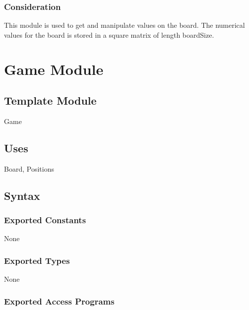 \documentclass[12pt]{article}
\begin{document}
\subsubsection* {Consideration}

This module is used to get and manipulate values on the board. The numerical values for the board is stored in a square matrix of length boardSize. 

\newpage

\section* {Game Module}

\subsection*{Template Module}

Game

\subsection* {Uses}

Board, Positions

\subsection* {Syntax}

\subsubsection* {Exported Constants}

None

\subsubsection* {Exported Types}

None

\subsubsection* {Exported Access Programs}
\end{document}
